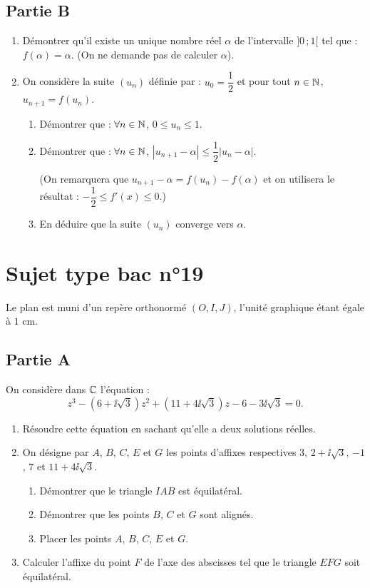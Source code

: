 \subsection*{Partie B}

\begin{enumerate}
	\item Démontrer qu'il existe un unique nombre réel $\alpha$ de l'intervalle $]0\,;1[$ tel que : $f(\alpha)=\alpha$. (On ne demande pas de calculer $\alpha$).
	\item On considère la suite $(u_n)$ définie par : $u_0=\dfrac12$ et pour tout $n\in\mathbb{N}$, $u_{n+1}=f(u_n)$.
	\begin{enumerate}
		\item Démontrer que : $\forall n\in\mathbb{N}$, $0\leqslant u_n\leqslant1$.
		\item Démontrer que : $\forall n\in\mathbb{N}$, $|u_{n+1}-\alpha|\leqslant\dfrac12|u_n-\alpha|$.

		(On remarquera que $u_{n+1}-\alpha=f(u_n)-f(\alpha)$ et on utilisera le résultat : $-\dfrac12\leqslant f'(x)\leqslant0$.)
		\item En déduire que la suite $(u_n)$ converge vers $\alpha$.
	\end{enumerate}
\end{enumerate}


\section*{Sujet type bac n°19}

Le plan est muni d'un repère orthonormé $(O,I,J)$, l'unité graphique étant égale à $1$ cm.

\subsection*{Partie A}

On considère dans $\mathbb{C}$ l'équation :
\[
z^3-(6+\ii\sqrt3)z^2+(11+4\ii\sqrt3)z-6-3\ii\sqrt3=0.
\]

\begin{enumerate}
	\item Résoudre cette équation en sachant qu'elle a deux solutions réelles.
	\item On désigne par $A$, $B$, $C$, $E$ et $G$ les points d'affixes respectives $3$, $2+\ii\sqrt3$, $-1$, $7$ et $11+4\ii\sqrt3$.
	\begin{enumerate}
		\item Démontrer que le triangle $IAB$ est équilatéral.
		\item Démontrer que les points $B$, $C$ et $G$ sont alignés.
		\item Placer les points $A$, $B$, $C$, $E$ et $G$.
	\end{enumerate}
	\item Calculer l'affixe du point $F$ de l'axe des abscisses tel que le triangle $EFG$ soit équilatéral.
\end{enumerate}

